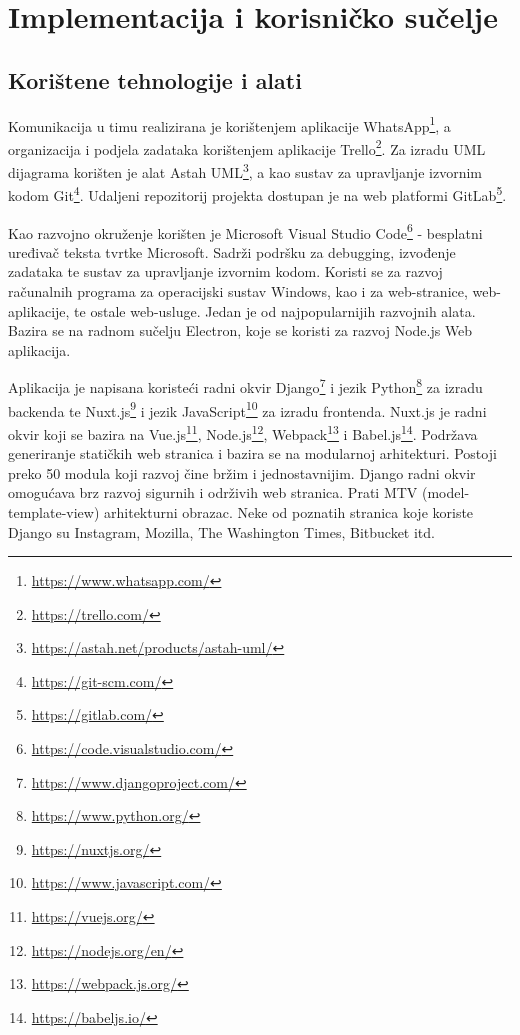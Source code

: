 \chapter{Implementacija i korisničko sučelje}
		
		
		\section{Korištene tehnologije i alati}
			
			
			Komunikacija u timu realizirana je korištenjem aplikacije WhatsApp\footnote{\url{https://www.whatsapp.com/}}, a organizacija i podjela zadataka korištenjem aplikacije Trello\footnote{\url{https://trello.com/}}. 
			Za izradu UML dijagrama korišten je alat Astah UML\footnote{\url{https://astah.net/products/astah-uml/}}, a kao sustav za upravljanje
			izvornim kodom Git\footnote{\url{https://git-scm.com/}}. Udaljeni repozitorij projekta dostupan je na web platformi
			GitLab\footnote{\url{https://gitlab.com/}}.
			
			Kao razvojno okruženje korišten je Microsoft Visual Studio Code\footnote{\url{https://code.visualstudio.com/}} - 
			besplatni uređivač teksta tvrtke Microsoft. Sadrži podršku za debugging, izvođenje zadataka te sustav za upravljanje izvornim kodom. Koristi se za razvoj računalnih
			programa za operacijski sustav Windows, kao i za web-stranice, web-aplikacije,
			te ostale web-usluge. Jedan je od najpopularnijih razvojnih alata. Bazira se na radnom sučelju Electron, koje se koristi za razvoj Node.js Web aplikacija.
			
			
			Aplikacija je napisana koristeći radni okvir Django\footnote{\url{https://www.djangoproject.com/}} i jezik Python\footnote{\url{https://www.python.org/}} za
			izradu backenda te Nuxt.js\footnote{\url{https://nuxtjs.org/}} i jezik JavaScript\footnote{\url{https://www.javascript.com/}} za izradu frontenda. Nuxt.js je radni okvir koji se bazira na Vue.js\footnote{\url{https://vuejs.org/}}, Node.js\footnote{\url{https://nodejs.org/en/}}, Webpack\footnote{\url{https://webpack.js.org/}} i Babel.js\footnote{\url{https://babeljs.io/}}. Podržava generiranje statičkih web stranica i bazira se na modularnoj arhitekturi. Postoji preko 50 modula koji razvoj čine bržim i jednostavnijim. Django radni okvir omogućava brz razvoj sigurnih i održivih web stranica. Prati MTV (model-template-view) arhitekturni obrazac. Neke od poznatih stranica koje koriste Django su Instagram, Mozilla, The Washington Times, Bitbucket itd.
			
